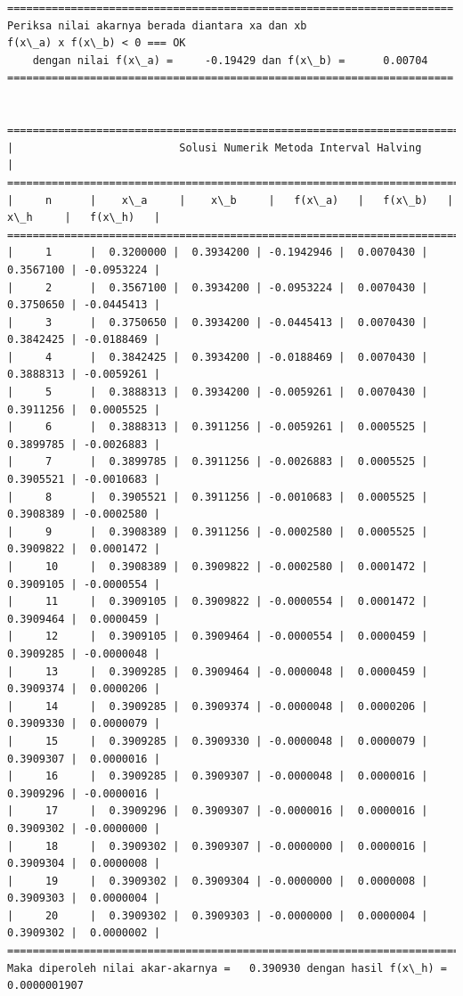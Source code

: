 \documentclass[10pt, a4paper]{article}
\begin{document}
\newpage
    \begin{Verbatim}[commandchars=\\\{\}]
======================================================================
Periksa nilai akarnya berada diantara xa dan xb
f(x\_a) x f(x\_b) < 0 === OK 
	dengan nilai f(x\_a) =     -0.19429 dan f(x\_b) =      0.00704
======================================================================


============================================================================================
|                          Solusi Numerik Metoda Interval Halving                          |
============================================================================================
|     n      |    x\_a     |    x\_b     |   f(x\_a)   |   f(x\_b)   |    x\_h     |   f(x\_h)   |
============================================================================================
|     1      |  0.3200000 |  0.3934200 | -0.1942946 |  0.0070430 |  0.3567100 | -0.0953224 |
|     2      |  0.3567100 |  0.3934200 | -0.0953224 |  0.0070430 |  0.3750650 | -0.0445413 |
|     3      |  0.3750650 |  0.3934200 | -0.0445413 |  0.0070430 |  0.3842425 | -0.0188469 |
|     4      |  0.3842425 |  0.3934200 | -0.0188469 |  0.0070430 |  0.3888313 | -0.0059261 |
|     5      |  0.3888313 |  0.3934200 | -0.0059261 |  0.0070430 |  0.3911256 |  0.0005525 |
|     6      |  0.3888313 |  0.3911256 | -0.0059261 |  0.0005525 |  0.3899785 | -0.0026883 |
|     7      |  0.3899785 |  0.3911256 | -0.0026883 |  0.0005525 |  0.3905521 | -0.0010683 |
|     8      |  0.3905521 |  0.3911256 | -0.0010683 |  0.0005525 |  0.3908389 | -0.0002580 |
|     9      |  0.3908389 |  0.3911256 | -0.0002580 |  0.0005525 |  0.3909822 |  0.0001472 |
|     10     |  0.3908389 |  0.3909822 | -0.0002580 |  0.0001472 |  0.3909105 | -0.0000554 |
|     11     |  0.3909105 |  0.3909822 | -0.0000554 |  0.0001472 |  0.3909464 |  0.0000459 |
|     12     |  0.3909105 |  0.3909464 | -0.0000554 |  0.0000459 |  0.3909285 | -0.0000048 |
|     13     |  0.3909285 |  0.3909464 | -0.0000048 |  0.0000459 |  0.3909374 |  0.0000206 |
|     14     |  0.3909285 |  0.3909374 | -0.0000048 |  0.0000206 |  0.3909330 |  0.0000079 |
|     15     |  0.3909285 |  0.3909330 | -0.0000048 |  0.0000079 |  0.3909307 |  0.0000016 |
|     16     |  0.3909285 |  0.3909307 | -0.0000048 |  0.0000016 |  0.3909296 | -0.0000016 |
|     17     |  0.3909296 |  0.3909307 | -0.0000016 |  0.0000016 |  0.3909302 | -0.0000000 |
|     18     |  0.3909302 |  0.3909307 | -0.0000000 |  0.0000016 |  0.3909304 |  0.0000008 |
|     19     |  0.3909302 |  0.3909304 | -0.0000000 |  0.0000008 |  0.3909303 |  0.0000004 |
|     20     |  0.3909302 |  0.3909303 | -0.0000000 |  0.0000004 |  0.3909302 |  0.0000002 |
============================================================================================
Maka diperoleh nilai akar-akarnya =   0.390930 dengan hasil f(x\_h) =    0.0000001907

    \end{Verbatim}
\end{document}
